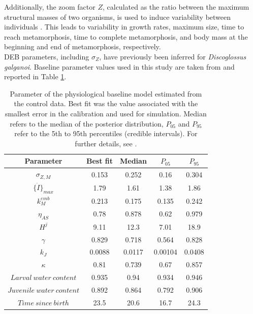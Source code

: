 \documentclass[utf8]{FrontiersinHarvard} %
\begin{document}
%
Additionally, the zoom factor $Z$, calculated as the ratio between the maximum structural masses of two organisms, 
is used to induce variability between individuals \citep{hansulDynamicEnergyBudget2026}. 
This leads to variability in growth rates, maximum size, time to reach metamorphosis, 
time to complete metamorphosis, 
and body mass at the beginning and end of metamorphosis, respectively.\\
DEB parameters, including $\sigma_{Z}$, have previously been inferred for \textit{Discoglossus galganoi}. 
Baseline parameter values used in this study are taken from \citet{hansulDynamicEnergyBudget2026} and reported in Table \ref{tab:params_discoglossus}. 

\begin{table}[h]
    \caption{Parameter of the physiological baseline model estimated from the control data. 
    Best fit was the value associated with the smallest error in the calibration and used for simulation.
    Median refers to the median of the posterior distribution, $P_{05}$ and $P_{95}$ refer to the 5th to 95th percentiles 
    (credible intervals).
    For further details, see \citet{hansulDynamicEnergyBudget2026}.}
    \label{tab:params_discoglossus}
    \begin{tabular}{ccccc}
    Parameter & Best fit & Median & $P_{05}$ & $P_{95}$\\
    \hline
    $\sigma_{Z,M}$ & 0.153 & 0.252 & 0.16 & 0.304\\
    $\{ \dot{I} \}_{max}$ & 1.79 & 1.61 & 1.38 & 1.86\\
    $k_M^{emb}$ & 0.213 & 0.175 & 0.135 & 0.242\\
    $\eta_{AS}$ & 0.78 & 0.878 & 0.62 & 0.979\\
    $H^{j}$ & 9.11 & 12.3 & 7.01 & 18.9\\
    $\gamma$ & 0.829 & 0.718 & 0.564 & 0.828\\
    $k_J$ & 0.0088 & 0.0117 & 0.00104 & 0.0408\\
    $\kappa$ & 0.81 & 0.739 & 0.67 & 0.857\\
    $Larval\ water\ content$ & 0.935 & 0.94 & 0.934 & 0.946\\
    $Juvenile\ water\ content$ & 0.892 & 0.864 & 0.792 & 0.906\\
    $Time\ since\ birth$ & 23.5 & 20.6 & 16.7 & 24.3\\
    \end{tabular}
\end{table}

%
\end{document}
